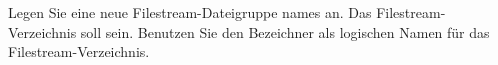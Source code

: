 \item Legen Sie eine neue Filestream-Dateigruppe names
 an. Das Filestream-Verzeichnis soll
 sein. Benutzen Sie den Bezeichner
 als logischen Namen für das
Filestream-Verzeichnis.
